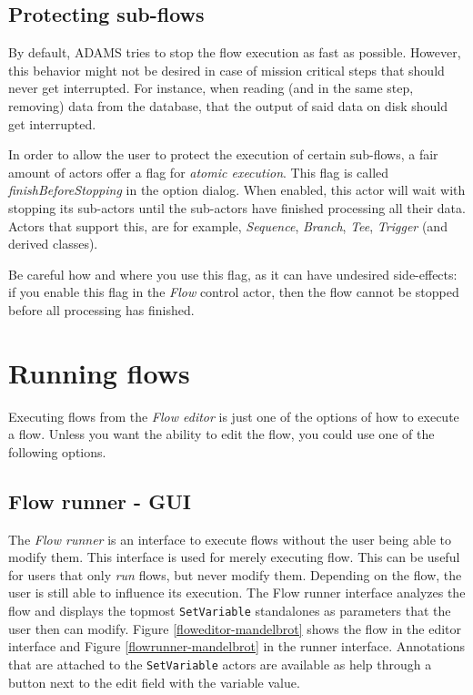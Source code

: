 \subsection{Protecting sub-flows}
By default, ADAMS tries to stop the flow execution as fast as possible. However,
this behavior might not be desired in case of mission critical steps that should
never get interrupted. For instance, when reading (and in the same step, removing)
data from the database, that the output of said data on disk should get 
interrupted. 

In order to allow the user to protect the execution of certain 
sub-flows, a fair amount of actors offer a flag for \textit{atomic execution}.
This flag is called \textit{finishBeforeStopping} in the option dialog. When 
enabled, this actor will wait with stopping its sub-actors until the sub-actors
have finished processing all their data. Actors that support this, are for 
example, \textit{Sequence}, \textit{Branch}, \textit{Tee}, \textit{Trigger} 
(and derived classes).

Be careful how and where you use this flag, as it can have undesired 
side-effects: if you enable this flag in the \textit{Flow} control actor, then 
the flow cannot be stopped before all processing has finished.

\newpage
\section{Running flows}
\label{running_flows}
Executing flows from the \textit{Flow editor} is just one of the options of
how to execute a flow. Unless you want the ability to edit the flow, you could 
use one of the following options.

\subsection{Flow runner - GUI}
The \textit{Flow runner} is an interface to execute flows without the user
being able to modify them. This interface is used for merely executing flow.
This can be useful for users that only \textit{run} flows, but never modify
them. Depending on the flow, the user is still able to influence its 
execution. The Flow runner interface analyzes the flow and displays the 
topmost \texttt{SetVariable} standalones as parameters that the user then
can modify. Figure \ref{floweditor-mandelbrot} shows the flow in the editor
interface and Figure \ref{flowrunner-mandelbrot} in the runner interface.
Annotations that are attached to the \texttt{SetVariable} actors are available
as help through a button next to the edit field with the variable value.

